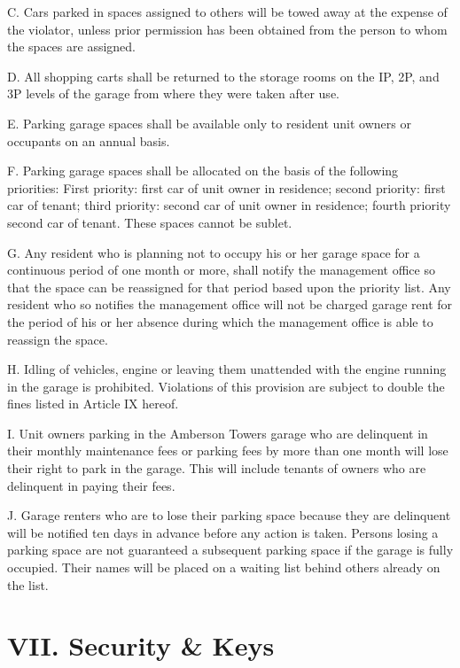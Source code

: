 \documentclass[
  14pt,
]{book}
\begin{document}
C. Cars parked in spaces assigned to others will be towed away at the expense of the violator, unless prior permission has been obtained from the person to whom the spaces are assigned.

D. All shopping carts shall be returned to the storage rooms on the IP, 2P, and 3P levels of the garage from where they were taken after use.

E. Parking garage spaces shall be available only to resident unit owners or occupants on an annual basis.

F. Parking garage spaces shall be allocated on the basis of the following priorities: First priority: first car of unit owner in residence; second priority: first car of tenant; third priority: second car of unit owner in residence; fourth priority second car of tenant. These spaces cannot be sublet.

G. Any resident who is planning not to occupy his or her garage space for a continuous period of one month or more, shall notify the management office so that the space can be reassigned for that period based upon the priority list. Any resident who so notifies the management office will not be charged garage rent for the period of his or her absence during which the management office is able to reassign the space.

H. Idling of vehicles, engine or leaving them unattended with the engine running in the garage is prohibited. Violations of this provision are subject to double the fines listed in Article IX hereof.

I. Unit owners parking in the Amberson Towers garage who are delinquent in their monthly maintenance fees or parking fees by more than one month will lose their right to park in the garage. This will include tenants of owners who are delinquent in paying their fees.

J. Garage renters who are to lose their parking space because they are delinquent will be notified ten days in advance before any action is taken. Persons losing a parking space are not guaranteed a subsequent parking space if the garage is fully occupied. Their names will be placed on a waiting list behind others already on the list.

\hypertarget{vii.-security-keys}{%
\section*{VII. Security \& Keys}\label{vii.-security-keys}}
\end{document}
